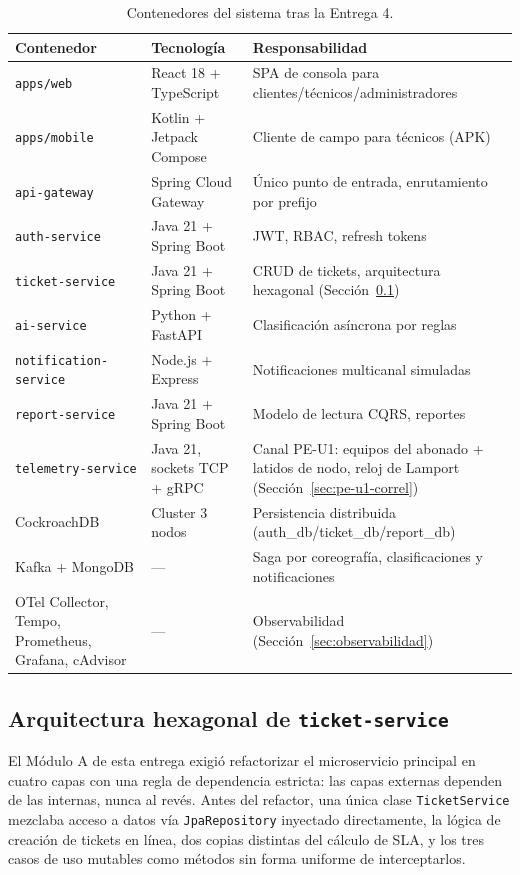 \begin{table}[H]
\centering
\small
\caption{Contenedores del sistema tras la Entrega 4.}
\label{tab:contenedores-e4}
\begin{tabular}{@{}p{3.1cm}p{2.6cm}p{7.8cm}@{}}
\toprule
\textbf{Contenedor} & \textbf{Tecnología} & \textbf{Responsabilidad} \\
\midrule
\texttt{apps/web} & React 18 + TypeScript & SPA de consola para clientes/técnicos/administradores \\
\texttt{apps/mobile} & Kotlin + Jetpack Compose & Cliente de campo para técnicos (APK) \\
\texttt{api-gateway} & Spring Cloud Gateway & Único punto de entrada, enrutamiento por prefijo \\
\texttt{auth-service} & Java 21 + Spring Boot & JWT, RBAC, refresh tokens \\
\texttt{ticket-service} & Java 21 + Spring Boot & CRUD de tickets, arquitectura hexagonal (Sección~\ref{sec:hexagonal-e4}) \\
\texttt{ai-service} & Python + FastAPI & Clasificación asíncrona por reglas \\
\texttt{notification-service} & Node.js + Express & Notificaciones multicanal simuladas \\
\texttt{report-service} & Java 21 + Spring Boot & Modelo de lectura CQRS, reportes \\
\texttt{telemetry-service} & Java 21, sockets TCP + gRPC & Canal PE-U1: equipos del abonado + latidos de nodo, reloj de Lamport (Sección~\ref{sec:pe-u1-correl}) \\
CockroachDB & Cluster 3 nodos & Persistencia distribuida (auth\_db/ticket\_db/report\_db) \\
Kafka + MongoDB & --- & Saga por coreografía, clasificaciones y notificaciones \\
OTel Collector, Tempo, Prometheus, Grafana, cAdvisor & --- & Observabilidad (Sección~\ref{sec:observabilidad}) \\
\bottomrule
\end{tabular}
\end{table}

\subsection{Arquitectura hexagonal de \texttt{ticket-service}}
\label{sec:hexagonal-e4}

El Módulo A de esta entrega exigió refactorizar el microservicio principal en cuatro capas con
una regla de dependencia estricta: las capas externas dependen de las internas, nunca al revés.
Antes del refactor, una única clase \texttt{TicketService} mezclaba acceso a datos vía
\texttt{JpaRepository} inyectado directamente, la lógica de creación de tickets en línea, dos
copias distintas del cálculo de SLA, y los tres casos de uso mutables como métodos sin forma
uniforme de interceptarlos.

